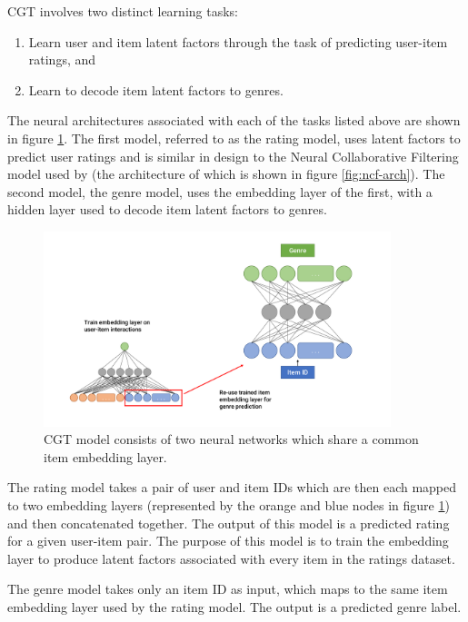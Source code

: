 CGT involves two distinct learning tasks:
\begin{enumerate}
    \item Learn user and item latent factors through the task of predicting user-item ratings, and
    \item Learn to decode item latent factors to genres.
\end{enumerate}
The neural architectures associated with each of the tasks listed above are shown in figure \ref{fig:4_CGT-architecture}. The first model, referred to as the rating model, uses latent factors to predict user ratings and is similar in design to the Neural Collaborative Filtering model used by \citeauthor{he2017neural} (the architecture of which is shown in figure \ref{fig:ncf-arch}). The second model, the genre model, uses the embedding layer of the first, with a hidden layer used to decode item latent factors to genres.

\begin{figure}[H]
\centering
\includegraphics[width=0.9\textwidth]{Figures/4_CGT-model.pdf}
\decoRule
\caption[CGT architecture]{CGT model consists of two neural networks which share a common item embedding layer.}
\label{fig:4_CGT-architecture}
\end{figure}

The rating model takes a pair of user and item IDs which are then each mapped to two embedding layers (represented by the orange and blue nodes in figure \ref{fig:4_CGT-architecture}) and then concatenated together. The output of this model is a predicted rating for a given user-item pair. The purpose of this model is to train the embedding layer to produce latent factors associated with every item in the ratings dataset.

The genre model takes only an item ID as input, which maps to the same item embedding layer used by the rating model. The output is a predicted genre label. 

